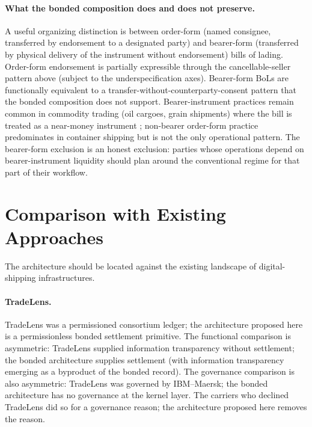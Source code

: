 \documentclass[11pt,a4paper]{article}
\theoremstyle{definition}
\theoremstyle{remark}
\begin{document}
\paragraph{What the bonded composition does and does not preserve.}
A useful organizing distinction is between order-form (named
consignee, transferred by endorsement to a designated party) and
bearer-form (transferred by physical delivery of the instrument
without endorsement) bills of lading. Order-form endorsement is
partially expressible through the cancellable-seller pattern above
(subject to the underspecification axes). Bearer-form BoLs are
functionally equivalent to a transfer-without-counterparty-consent
pattern that the bonded composition does not support.
Bearer-instrument practices remain common in commodity trading
(oil cargoes, grain shipments) where the bill is treated as a
near-money instrument \citep{goode_gullifer_2017}; non-bearer
order-form practice predominates in container shipping but is not
the only operational pattern. The bearer-form exclusion is an
honest exclusion: parties whose operations depend on
bearer-instrument liquidity should plan around the conventional
regime for that part of their workflow.

\section{Comparison with Existing Approaches}
\label{sec:comparison}

The architecture should be located against the existing landscape
of digital-shipping infrastructures.

\paragraph{TradeLens.}
TradeLens was a permissioned consortium ledger; the architecture
proposed here is a permissionless bonded settlement primitive.
The functional comparison is asymmetric: TradeLens supplied
information transparency without settlement; the bonded
architecture supplies settlement (with information transparency
emerging as a byproduct of the bonded record). The governance
comparison is also asymmetric: TradeLens was governed by
IBM--Maersk; the bonded architecture has no governance at the
kernel layer. The carriers who declined TradeLens did so for a
governance reason; the architecture proposed here removes the
reason.
\end{document}
